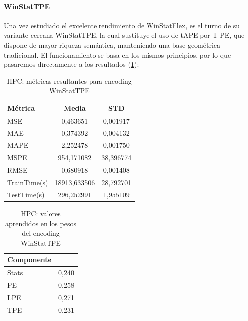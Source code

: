 \paragraph{WinStatTPE}

Una vez estudiado el excelente rendimiento de WinStatFlex, es el turno de su variante cercana WinStatTPE, la cual sustituye el uso de tAPE por T-PE, que dispone de mayor riqueza semántica, manteniendo una base geométrica tradicional. El funcionamiento se basa en los mismos principios, por lo que pasaremos directamente a los resultados (\ref{hpctpe}):
\begin{table}[!ht]
	\centering
	\begin{tabular}{l|c|c}
		\toprule
		Métrica & Media & STD \\
		\midrule
		MSE & 0,463651 & 0,001917 \\
		MAE & 0,374392 & 0,004132 \\
		MAPE & 2,252478 & 0,001750 \\
		MSPE & 954,171082 & 38,396774 \\
		RMSE & 0,680918 & 0,001408 \\
		TrainTime(s) & 18913,633506 & 28,792701 \\
		TestTime(s) & 296,252991 & 1,955109 \\
		\bottomrule
	\end{tabular}
	\caption{HPC: métricas resultantes para encoding WinStatTPE}
	\label{hpctpe}
\end{table}

\begin{table}[!ht]
	\centering
		\begin{tabular}{l|N}
		\toprule
		Componente &  \\
		\midrule
		Stats & 0,240 \\
		PE & 0,258 \\
		LPE & 0,271 \\
		TPE & 0,231 \\
		\bottomrule
	\end{tabular}
	\caption{HPC: valores aprendidos en los pesos del encoding WinStatTPE}
	\label{hpctpepesos}
\end{table}

